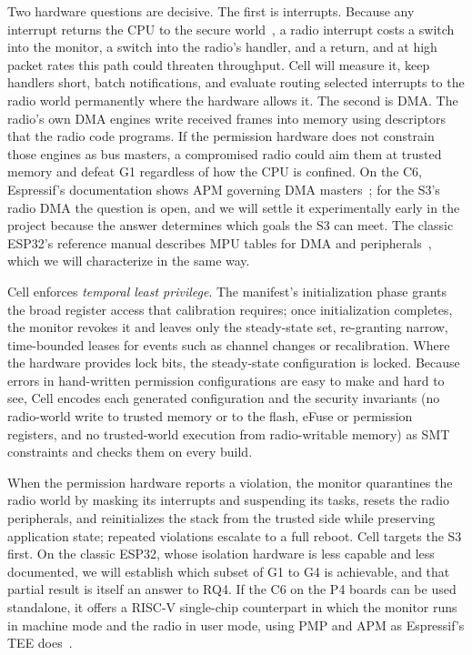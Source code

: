 \documentclass[conference,10pt]{IEEEtran}
\begin{document}
Two hardware questions are decisive. The first is interrupts. Because any interrupt returns the CPU to the secure world~\cite{espprivsepwcl}, a radio interrupt costs a switch into the monitor, a switch into the radio's handler, and a return, and at high packet rates this path could threaten throughput. Cell will measure it, keep handlers short, batch notifications, and evaluate routing selected interrupts to the radio world permanently where the hardware allows it. The second is DMA. The radio's own DMA engines write received frames into memory using descriptors that the radio code programs. If the permission hardware does not constrain those engines as bus masters, a compromised radio could aim them at trusted memory and defeat G1 regardless of how the CPU is confined. On the C6, Espressif's documentation shows APM governing DMA masters~\cite{esptee}; for the S3's radio DMA the question is open, and we will settle it experimentally early in the project because the answer determines which goals the S3 can meet. The classic ESP32's reference manual describes MPU tables for DMA and peripherals~\cite{esp32trm}, which we will characterize in the same way.

Cell enforces \emph{temporal least privilege}. The manifest's initialization phase grants the broad register access that calibration requires; once initialization completes, the monitor revokes it and leaves only the steady-state set, re-granting narrow, time-bounded leases for events such as channel changes or recalibration. Where the hardware provides lock bits, the steady-state configuration is locked. Because errors in hand-written permission configurations are easy to make and hard to see, Cell encodes each generated configuration and the security invariants (no radio-world write to trusted memory or to the flash, eFuse or permission registers, and no trusted-world execution from radio-writable memory) as SMT constraints and checks them on every build.

When the permission hardware reports a violation, the monitor quarantines the radio world by masking its interrupts and suspending its tasks, resets the radio peripherals, and reinitializes the stack from the trusted side while preserving application state; repeated violations escalate to a full reboot. Cell targets the S3 first. On the classic ESP32, whose isolation hardware is less capable and less documented, we will establish which subset of G1 to G4 is achievable, and that partial result is itself an answer to RQ4. If the C6 on the P4 boards can be used standalone, it offers a RISC-V single-chip counterpart in which the monitor runs in machine mode and the radio in user mode, using PMP and APM as Espressif's TEE does~\cite{esptee}.
\end{document}
